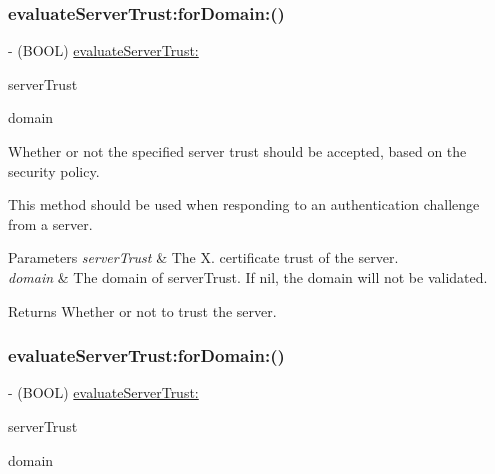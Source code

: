 \subsubsection{\texorpdfstring{evaluate\+Server\+Trust\+:for\+Domain\+:()}{evaluateServerTrust:forDomain:()}\hspace{0.1cm}{\footnotesize\ttfamily [2/3]}}
{\footnotesize\ttfamily -\/ (B\+O\+OL) \mbox{\hyperlink{interface_a_f_security_policy_a404e83f245843cb7fd6408d5e9ee15e0}{evaluate\+Server\+Trust\+:}} \begin{DoxyParamCaption}\item[{(Sec\+Trust\+Ref)}]{server\+Trust }\item[{forDomain:(nullable N\+S\+String $\ast$)}]{domain }\end{DoxyParamCaption}}

Whether or not the specified server trust should be accepted, based on the security policy.

This method should be used when responding to an authentication challenge from a server.


\begin{DoxyParams}{Parameters}
{\em server\+Trust} & The X. certificate trust of the server. \\
\hline
{\em domain} & The domain of server\+Trust. If {\ttfamily nil}, the domain will not be validated.\\
\hline
\end{DoxyParams}
\begin{DoxyReturn}{Returns}
Whether or not to trust the server. 
\end{DoxyReturn}
\mbox{\label{interface_a_f_security_policy_a892268d5a78bcf21d188486aca1aea56}} 
\subsubsection{\texorpdfstring{evaluate\+Server\+Trust\+:for\+Domain\+:()}{evaluateServerTrust:forDomain:()}\hspace{0.1cm}{\footnotesize\ttfamily [3/3]}}
{\footnotesize\ttfamily -\/ (B\+O\+OL) \mbox{\hyperlink{interface_a_f_security_policy_a404e83f245843cb7fd6408d5e9ee15e0}{evaluate\+Server\+Trust\+:}} \begin{DoxyParamCaption}\item[{(Sec\+Trust\+Ref)}]{server\+Trust }\item[{forDomain:(nullable N\+S\+String $\ast$)}]{domain }\end{DoxyParamCaption}}

